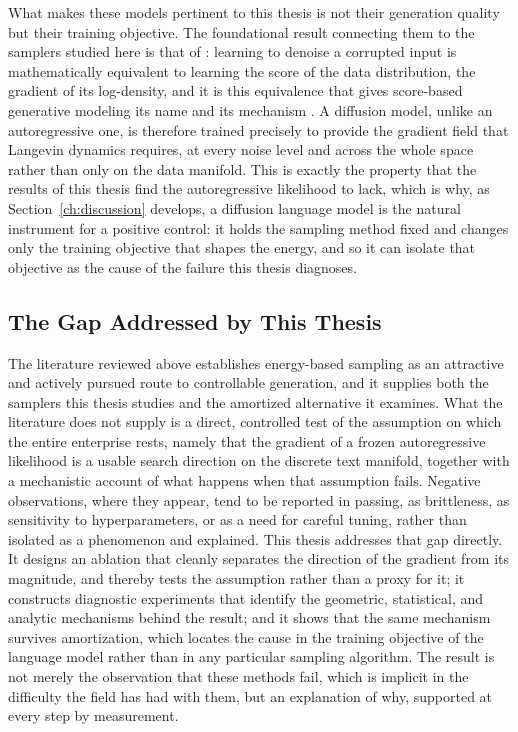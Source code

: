 What makes these models pertinent to this thesis is not their generation quality but their training objective. The foundational result connecting them to the samplers studied here is that of \citet{vincent2011connection}: learning to denoise a corrupted input is mathematically equivalent to learning the score of the data distribution, the gradient of its log-density, and it is this equivalence that gives score-based generative modeling its name and its mechanism \citep{song2019generative, ho2020denoising}. A diffusion model, unlike an autoregressive one, is therefore trained precisely to provide the gradient field that Langevin dynamics requires, at every noise level and across the whole space rather than only on the data manifold. This is exactly the property that the results of this thesis find the autoregressive likelihood to lack, which is why, as Section~\ref{ch:discussion} develops, a diffusion language model is the natural instrument for a positive control: it holds the sampling method fixed and changes only the training objective that shapes the energy, and so it can isolate that objective as the cause of the failure this thesis diagnoses.

\subsection{The Gap Addressed by This Thesis}
\label{sec:rel-gap}

The literature reviewed above establishes energy-based sampling as an attractive and actively pursued route to controllable generation, and it supplies both the samplers this thesis studies and the amortized alternative it examines. What the literature does not supply is a direct, controlled test of the assumption on which the entire enterprise rests, namely that the gradient of a frozen autoregressive likelihood is a usable search direction on the discrete text manifold, together with a mechanistic account of what happens when that assumption fails. Negative observations, where they appear, tend to be reported in passing, as brittleness, as sensitivity to hyperparameters, or as a need for careful tuning, rather than isolated as a phenomenon and explained. This thesis addresses that gap directly. It designs an ablation that cleanly separates the direction of the gradient from its magnitude, and thereby tests the assumption rather than a proxy for it; it constructs diagnostic experiments that identify the geometric, statistical, and analytic mechanisms behind the result; and it shows that the same mechanism survives amortization, which locates the cause in the training objective of the language model rather than in any particular sampling algorithm. The result is not merely the observation that these methods fail, which is implicit in the difficulty the field has had with them, but an explanation of why, supported at every step by measurement.
